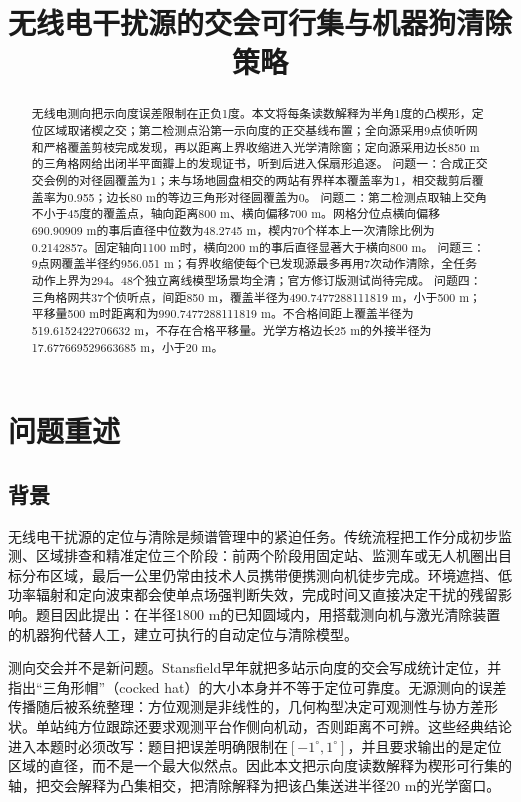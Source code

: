 \documentclass{cumcmthesis}
\title{无线电干扰源的交会可行集与机器狗清除策略}
\begin{document}
\maketitle

\begin{abstract}
无线电测向把示向度误差限制在正负1度。本文将每条读数解释为半角1度的凸楔形，定位区域取诸楔之交；第二检测点沿第一示向度的正交基线布置；全向源采用9点侦听网和严格覆盖剪枝完成发现，再以距离上界收缩进入光学清除窗；定向源采用边长850 m的三角格网给出闭半平面瓣上的发现证书，听到后进入保扇形追逐。
问题一：合成正交交会例的对径圆覆盖为1；未与场地圆盘相交的两站有界样本覆盖率为1，相交裁剪后覆盖率为0.955；边长80 m的等边三角形对径圆覆盖为0。
问题二：第二检测点取轴上交角不小于45度的覆盖点，轴向距离800 m、横向偏移700 m。网格分位点横向偏移690.90909 m的事后直径中位数为48.2745 m，楔内70个样本上一次清除比例为0.2142857。固定轴向1100 m时，横向200 m的事后直径显著大于横向800 m。
问题三：9点网覆盖半径约956.051 m；有界收缩使每个已发现源最多再用7次动作清除，全任务动作上界为294。48个独立离线模型场景均全清；官方修订版测试尚待完成。
问题四：三角格网共37个侦听点，间距850 m，覆盖半径为490.7477288111819 m，小于500 m；平移量500 m时距离和为990.7477288111819 m。不合格间距上覆盖半径为519.6152422706632 m，不存在合格平移量。光学方格边长25 m的外接半径为17.677669529663685 m，小于20 m。
\end{abstract}

\section{问题重述}

\subsection{背景}

无线电干扰源的定位与清除是频谱管理中的紧迫任务。传统流程把工作分成初步监测、区域排查和精准定位三个阶段：前两个阶段用固定站、监测车或无人机圈出目标分布区域，最后一公里仍常由技术人员携带便携测向机徒步完成。环境遮挡、低功率辐射和定向波束都会使单点场强判断失效，完成时间又直接决定干扰的残留影响。题目因此提出：在半径1800 m的已知圆域内，用搭载测向机与激光清除装置的机器狗代替人工，建立可执行的自动定位与清除模型。

测向交会并不是新问题。Stansfield早年就把多站示向度的交会写成统计定位，并指出“三角形帽”（cocked hat）的大小本身并不等于定位可靠度\cite{stansfield1947}。无源测向的误差传播随后被系统整理：方位观测是非线性的，几何构型决定可观测性与协方差形状\cite{torrieri1984,foy1976}。单站纯方位跟踪还要求观测平台作侧向机动，否则距离不可辨\cite{nardone1984}。这些经典结论进入本题时必须改写：题目把误差明确限制在$[-1^\circ,1^\circ]$，并且要求输出的是定位区域的直径，而不是一个最大似然点。因此本文把示向度读数解释为楔形可行集的轴，把交会解释为凸集相交，把清除解释为把该凸集送进半径20 m的光学窗口。
\end{document}
